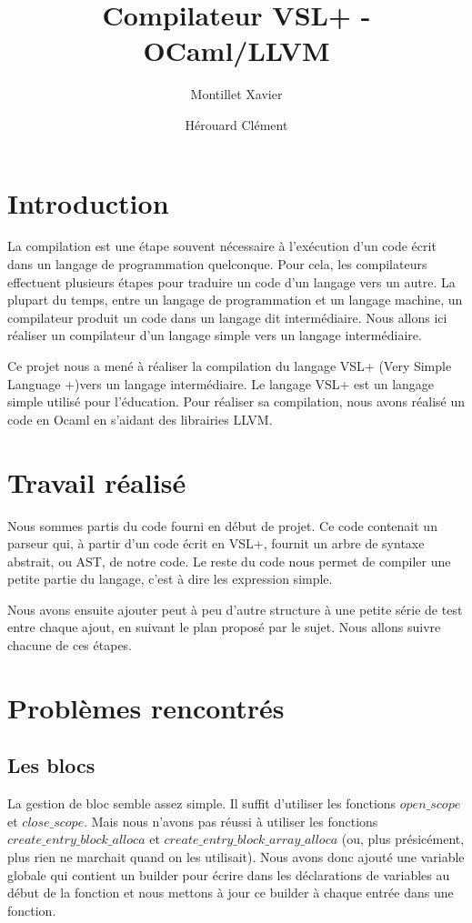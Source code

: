 \documentclass[10pt,a4paper]{article}
\begin{document}
\title{Compilateur VSL+ - OCaml/LLVM}
\author{Montillet Xavier \and Hérouard Clément}

\maketitle

\section{Introduction}
La compilation est une étape souvent nécessaire à l'exécution d'un code écrit dans un langage de programmation quelconque. Pour cela, les compilateurs effectuent plusieurs étapes pour traduire un code d'un langage vers un autre. La plupart du temps, entre un langage de programmation et un langage machine, un compilateur produit un code dans un langage dit intermédiaire. Nous allons ici réaliser un compilateur d'un langage simple vers un langage intermédiaire.

Ce projet nous a mené à réaliser la compilation du langage VSL+ (Very Simple Language +)vers un langage intermédiaire. Le langage VSL+ est un langage simple utilisé pour l'éducation. Pour réaliser sa compilation, nous avons réalisé un code en Ocaml en s'aidant des librairies LLVM.
 
\section{Travail réalisé}

Nous sommes partis du code fourni en début de projet. Ce code contenait un parseur qui, à partir d'un code écrit en VSL+, fournit un arbre de syntaxe abstrait, ou AST, de notre code. Le reste du code nous permet de compiler une petite partie du langage, c'est à dire les expression simple.

Nous avons ensuite ajouter peut à peu d'autre structure à une petite série de test entre chaque ajout, en suivant le plan proposé par le sujet. Nous allons suivre chacune de ces étapes.

\section{Probl\`emes rencontr\'es}

\subsection{Les blocs}

La gestion de bloc semble assez simple. Il suffit d'utiliser les fonctions  $open \_ scope$ et $close \_ scope$. Mais nous n'avons pas r\'eussi \`a utiliser les fonctions $create\_entry\_block\_alloca$ et $create\_entry\_block\_array\_alloca$ (ou, plus pr\'esic\'ement, plus rien ne marchait quand on les utilisait). Nous avons donc ajout\'e une variable globale qui contient un builder pour \'ecrire dans les d\'eclarations de variables au d\'ebut de la fonction et nous mettons \`a jour ce builder \`a chaque entr\'ee dans une fonction.
\end{document}
